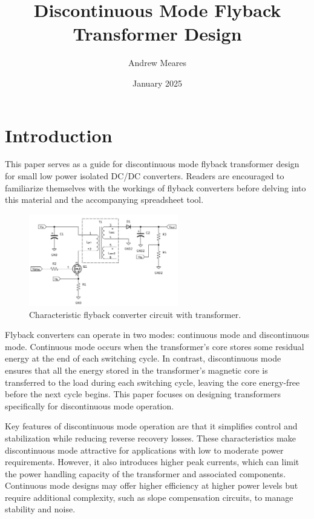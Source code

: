 \documentclass{article}
\title{Discontinuous Mode Flyback Transformer Design}
\author{Andrew Meares}
\date{January 2025}
\begin{document}
\maketitle

\section{Introduction}
This paper serves as a guide for discontinuous mode flyback transformer design for small low power isolated DC/DC converters.
Readers are encouraged to familiarize themselves with the workings of flyback converters before delving into this material and the accompanying spreadsheet tool.

\begin{figure}[h]
\centering
\includegraphics[height=4cm]{flyback1.jpg}
\caption{Characteristic flyback converter circuit with transformer.}
\label{fig:flyback_example}
\end{figure}

Flyback converters can operate in two modes: continuous mode and discontinuous mode. Continuous mode occurs when the transformer’s core stores some residual energy at the end of each switching cycle. In contrast, discontinuous mode ensures that all the energy stored in the transformer’s magnetic core is transferred to the load during each switching cycle, leaving the core energy-free before the next cycle begins. This paper focuses on designing transformers specifically for discontinuous mode operation.

Key features of discontinuous mode operation are that it simplifies control and stabilization while reducing reverse recovery losses. These characteristics make discontinuous mode attractive for applications with low to moderate power requirements. However, it also introduces higher peak currents, which can limit the power handling capacity of the transformer and associated components. Continuous mode designs may offer higher efficiency at higher power levels but require additional complexity, such as slope compensation circuits, to manage stability and noise.
\end{document}
